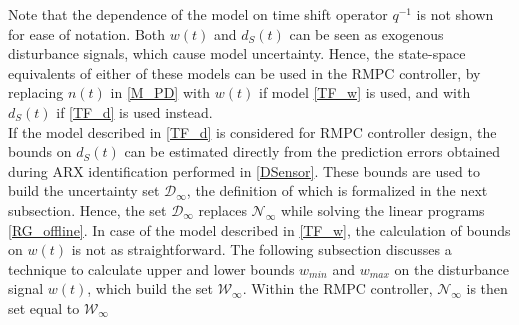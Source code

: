 \documentclass[letterpaper, 10 pt, conference]{ieeeconf}  %
\begin{document}
	Note that the dependence of the model on time shift operator $q^{-1}$ is not shown for ease of notation. Both $w(t)$ and $d_S(t)$ can be seen as exogenous disturbance signals, which cause model uncertainty. Hence, the state-space equivalents of either of these models can be used in the RMPC controller, by replacing $n(t)$ in \eqref{M_PD} with $w(t)$ if model \eqref{TF_w} is used, and with $d_S(t)$ if \eqref{TF_d} is used instead. \\
	If the model described in \eqref{TF_d} is considered for RMPC controller design, the bounds on $d_S(t)$ can be estimated directly from the prediction errors obtained during ARX identification performed in \eqref{DSensor}. These bounds are used to build the uncertainty set $\mathcal{D}_{\infty}$, the definition of which is formalized in the next subsection. Hence, the set $\mathcal{D}_{\infty}$ replaces $\mathcal{N}_{\infty}$ while solving the linear programs \eqref{RG_offline}.	In case of the model described in \eqref{TF_w}, the calculation of bounds on $w(t)$ is not as straightforward. 
	The following subsection discusses a technique to calculate upper and lower bounds $w_{min}$ and $w_{max}$ on the disturbance signal $w(t)$, which build the set $\mathcal{W}_{\infty}$. Within the RMPC controller, $\mathcal{N}_{\infty}$ is then set equal to $\mathcal{W}_{\infty}$
\end{document}
